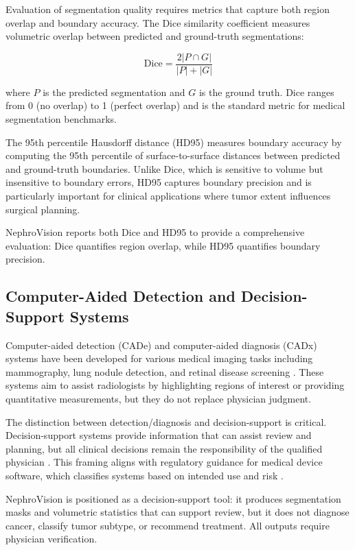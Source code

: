 Evaluation of segmentation quality requires metrics that capture both region overlap and boundary accuracy. The Dice similarity coefficient \cite{dice} measures volumetric overlap between predicted and ground-truth segmentations:

\begin{equation}
\text{Dice} = \frac{2 |P \cap G|}{|P| + |G|}
\end{equation}

where $P$ is the predicted segmentation and $G$ is the ground truth. Dice ranges from 0 (no overlap) to 1 (perfect overlap) and is the standard metric for medical segmentation benchmarks.

The 95th percentile Hausdorff distance (HD95) \cite{hausdorff} measures boundary accuracy by computing the 95th percentile of surface-to-surface distances between predicted and ground-truth boundaries. Unlike Dice, which is sensitive to volume but insensitive to boundary errors, HD95 captures boundary precision and is particularly important for clinical applications where tumor extent influences surgical planning.

NephroVision reports both Dice and HD95 to provide a comprehensive evaluation: Dice quantifies region overlap, while HD95 quantifies boundary precision.

\subsection{Computer-Aided Detection and Decision-Support Systems}

Computer-aided detection (CADe) and computer-aided diagnosis (CADx) systems have been developed for various medical imaging tasks including mammography, lung nodule detection, and retinal disease screening \cite{cad_review}. These systems aim to assist radiologists by highlighting regions of interest or providing quantitative measurements, but they do not replace physician judgment.

The distinction between detection/diagnosis and decision-support is critical. Decision-support systems provide information that can assist review and planning, but all clinical decisions remain the responsibility of the qualified physician \cite{decision_support_scope}. This framing aligns with regulatory guidance for medical device software, which classifies systems based on intended use and risk \cite{iec62304, fda_samd}.

NephroVision is positioned as a decision-support tool: it produces segmentation masks and volumetric statistics that can support review, but it does not diagnose cancer, classify tumor subtype, or recommend treatment. All outputs require physician verification.

